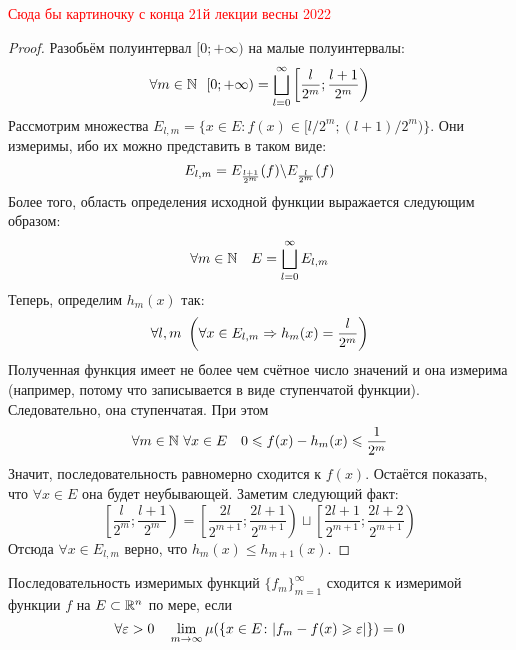 \textcolor{red}{Сюда бы картиночку с конца 21й лекции весны 2022}

\begin{proof}
	Разобьём полуинтервал $[0; +\infty)$ на малые полуинтервалы:
	\[
		\forall m \in \N\ \ [0; +\infty) = \bscup_{l = 0}^\infty \left[\frac{l}{2^m}; \frac{l + 1}{2^m}\right)
	\]
	Рассмотрим множества $E_{l, m} = \{x \in E \colon f(x) \in [l / 2^m; (l + 1) / 2^m)\}$. Они измеримы, ибо их можно представить в таком виде:
	\[
		E_{l, m} = E_{\frac{l + 1}{2^m}}(f) \backslash E_{\frac{l}{2^m}}(f)
	\]
	Более того, область определения исходной функции выражается следующим образом:
	\[
		\forall m \in \mathbb{N} \quad E = \bigsqcup_{l = 0}^\infty E_{l, m}
	\]
	Теперь, определим $h_m(x)$ так:
	\[
		\forall l, m\ \left(\forall x \in E_{l, m} \Rightarrow h_m(x) = \frac{l}{2^m}\right)
	\]
	Полученная функция имеет не более чем счётное число значений и она измерима (например, потому что записывается в виде ступенчатой функции). Следовательно, она ступенчатая. При этом
	\[
		\forall m \in \N\ \forall x \in E \quad 0 \le f(x) - h_m(x) \le \frac{1}{2^m}
	\]
	Значит, последовательность равномерно сходится к $f(x)$. Остаётся показать, что $\forall x \in E$ она будет неубывающей. Заметим следующий факт:
	\[
		\left[\frac{l}{2^m}; \frac{l + 1}{2^m}\right) = \left[\frac{2l}{2^{m + 1}}; \frac{2l + 1}{2^{m + 1}}\right) \sqcup \left[\frac{2l + 1}{2^{m + 1}}; \frac{2l + 2}{2^{m + 1}}\right)
	\]
	Отсюда $\forall x \in E_{l, m}$ верно, что $h_m(x) \le h_{m + 1}(x)$.
\end{proof}

\begin{definition}
	Последовательность измеримых функций $\{f_m\}_{m = 1}^\infty$ сходится к измеримой функции $f$ на $E \subset \mathbb{R}^n$ по мере, если
	\[
		\forall \varepsilon > 0 \quad \lim_{m \to \infty} \mu(\{x \in E \colon |f_m - f(x) \geqslant \varepsilon|\}) = 0
	\]
\end{definition}